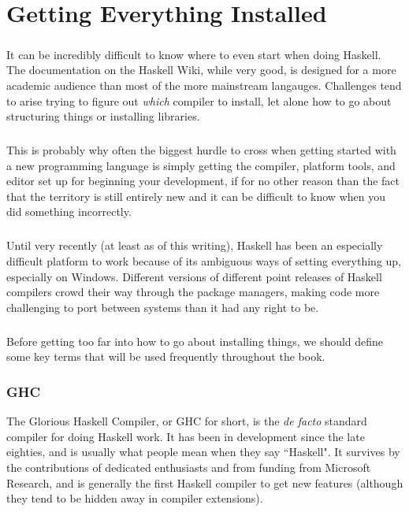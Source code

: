 \chapter{Getting Everything Installed}


\paragraph{}
It can be incredibly difficult to know where to even start when doing Haskell.  The documentation on the Haskell Wiki, while very good, is designed for a more academic audience than most of the more mainstream langauges. Challenges tend to arise trying to figure out \textit{which} compiler to install, let alone how to go about structuring things or installing libraries.  

\paragraph{}
This is probably why often the biggest hurdle to cross when getting started with a new programming language is simply getting the compiler, platform tools, and editor set up for beginning your development, if for no other reason than the fact that the territory is still entirely new and it can be difficult to know when you did something incorrectly.  

\paragraph{}
Until very recently (at least as of this writing), Haskell has been an especially difficult platform to work because of its ambiguous ways of setting everything up, especially on Windows. Different versions of different point releases of Haskell compilers crowd their way through the package managers, making code more challenging to port between systems than it had any right to be. 

\paragraph{}
Before getting too far into how to go about installing things, we should define some key terms that will be used frequently throughout the book. 


\subsection{GHC}
The Glorious Haskell Compiler, or GHC for short, is the \textit{de facto} standard compiler for doing Haskell work.  It has been in development since the late eighties, and is usually what people mean when they say ``Haskell".  It survives by the contributions of dedicated enthusiasts and from funding from Microsoft Research, and is generally the first Haskell compiler to get new features (although they tend to be hidden away in compiler extensions). 

